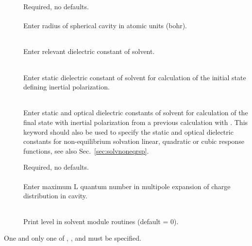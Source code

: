 \begin{description}
\item[]
  Required, no defaults.\\
  \\
  Enter radius of spherical cavity in atomic units (bohr).

\item[]
  \\
  Enter relevant dielectric constant of solvent.

\item[]
  \\
  Enter static dielectric constant of solvent for calculation
  of the initial state defining inertial polarization.

\item[]
  \\
  Enter static and optical dielectric constants of solvent
  for calculation of the final state with inertial polarization
  from a previous calculation with . 
  This keyword should also be used to specify the
  static and optical dielectric constants for non-equilibrium
  solvation linear, quadratic or cubic response functions, see also Sec.~\ref{sec:solvnoneqrsp}.

\item[]
  Required, no defaults.\\
  \\
  Enter maximum L quantum number in multipole expansion of charge
  distribution in cavity.

\item[]
   \\
  Print level in solvent module routines (default = 0).
\end{description}


One and only one of ,
, and  must be
specified.
\fi %



\pagebreak[3]
\subsection{\label{ref-stpinp}}

